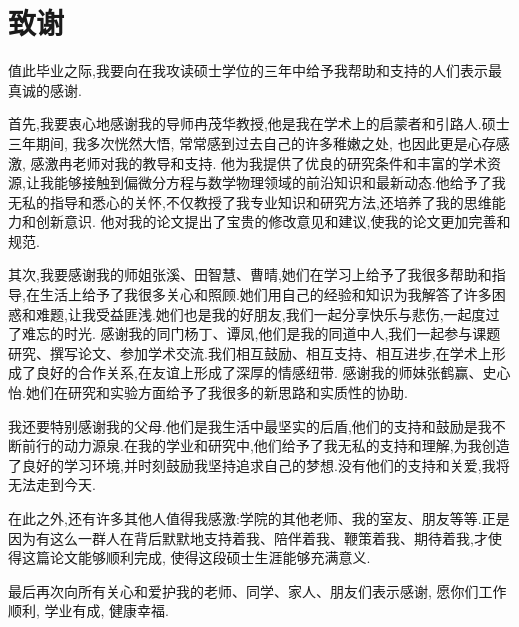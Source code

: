 \chapter{致谢}
值此毕业之际,我要向在我攻读硕士学位的三年中给予我帮助和支持的人们表示最真诚的感谢.

首先,我要衷心地感谢我的导师冉茂华教授,他是我在学术上的启蒙者和引路人.硕士三年期间, 我多次恍然大悟, 常常感到过去自己的许多稚嫩之处, 也因此更是心存感激, 感激冉老师对我的教导和支持.
他为我提供了优良的研究条件和丰富的学术资源,让我能够接触到偏微分方程与数学物理领域的前沿知识和最新动态.他给予了我无私的指导和悉心的关怀,不仅教授了我专业知识和研究方法,还培养了我的思维能力和创新意识.
他对我的论文提出了宝贵的修改意见和建议,使我的论文更加完善和规范.

其次,我要感谢我的师姐张溪、田智慧、曹晴,她们在学习上给予了我很多帮助和指导,在生活上给予了我很多关心和照顾.她们用自己的经验和知识为我解答了许多困惑和难题,让我受益匪浅.她们也是我的好朋友,我们一起分享快乐与悲伤,一起度过了难忘的时光.
感谢我的同门杨丁、谭凤,他们是我的同道中人,我们一起参与课题研究、撰写论文、参加学术交流.我们相互鼓励、相互支持、相互进步,在学术上形成了良好的合作关系,在友谊上形成了深厚的情感纽带.
感谢我的师妹张鹤赢、史心怡.她们在研究和实验方面给予了我很多的新思路和实质性的协助.

我还要特别感谢我的父母.他们是我生活中最坚实的后盾,他们的支持和鼓励是我不断前行的动力源泉.在我的学业和研究中,他们给予了我无私的支持和理解,为我创造了良好的学习环境,并时刻鼓励我坚持追求自己的梦想.没有他们的支持和关爱,我将无法走到今天.

在此之外,还有许多其他人值得我感激:学院的其他老师、我的室友、朋友等等.正是因为有这么一群人在背后默默地支持着我、陪伴着我、鞭策着我、期待着我,才使得这篇论文能够顺利完成, 使得这段硕士生涯能够充满意义.

最后再次向所有关心和爱护我的老师、同学、家人、朋友们表示感谢, 愿你们工作顺利, 学业有成, 健康幸福.

